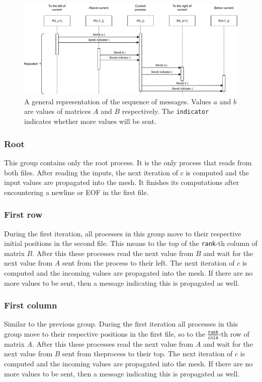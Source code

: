 \documentclass[pdftex, 11pt, a4paper, titlepage]{article}
\begin{document}
    \begin{figure}[h]
        \centering
        \includegraphics[scale=0.8]{sequence_diagram.pdf}
        \caption{A general representation of the sequence of messages. Values $a$ and
            $b$ are values of matrices $A$ and $B$ respectively. The
            \texttt{indicator} indicates whether more values will be sent.}
        \label{fig:sequence_diagram}
    \end{figure}

    \subsubsection*{Root}
    This group contains only the root process. It is the only process that reads from
    both files. After reading the inputs, the next iteration of $c$ is computed and
    the input values are propagated into the mesh. It finishes its computations after
    encountering a newline or EOF in the first file.

    \subsubsection*{First row}
    During the first iteration, all processes in this group move to their respective
    initial positions in the second file. This means to the top of the \texttt{rank}-th
    column of matrix $B$. After this these processes read the next value from $B$ and
    wait for the next value from $A$ sent from the process to their left.
    The next iteration of $c$ is computed and the incoming values are propagated into
    the mesh. If there are no more values to be sent, then a message indicating this
    is propagated as well.

    \subsubsection*{First column}
    Similar to the previous group. During the first iteration all processes in this
    group move to their respective positions in the first file, so to
    the $\frac{\texttt{rank}}{\texttt{cols}}$-th row of matrix $A$. After this these
    processes read the next value from $A$ and wait for the next value from $B$ sent
    from theprocess to their top. The next iteration of $c$ is computed and the
    incoming values are propagated into the mesh. If there are no more values
    to be sent, then a message indicating this is propagated as well.
\end{document}
